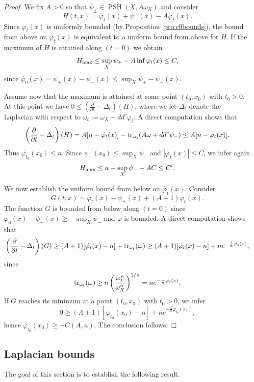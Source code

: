 \documentclass[a4paper,11pt,leqno,english]{smfart}
\theoremstyle{plain}
\theoremstyle{plain}
\numberwithin{equation}{section} %
\numberwithin{figure}{section} %
\theoremstyle{plain}
\theoremstyle{plain}
\theoremstyle{remark}
\theoremstyle{remark}
\theoremstyle{definition}
\theoremstyle{plain}
\theoremstyle{plain}
\theoremstyle{definition}
\newcommand{\f}{\varphi}
\newcommand{\p}{\psi}
\newcommand{\PSH}{\operatorname{PSH}}
\begin{document}
\begin{proof}
We fix $A>0$  so that $\p_{\pm} \in \PSH(X,A \omega_X)$ and
consider 
$$
H(t,x)=\dot{\f_t}(x)+\p_-(x)-A \f_t(x).
$$
Since $\f_t(x)$ is uniformly bounded (by Proposition \ref{pro:c0bounds}), the bound from above on
$\dot{\f_t}(x)$ is equivalent to a uniform bound from above for $H$.
If the maximum of $H$ is attained along $(t=0)$ we obtain
$$
H_{\rm max} \leq \sup_X \p_+-A \inf \f_t(x) \leq C,
$$
since $\dot{\f_0}(x)=\p_+(x)-\p_-(x)\leq \sup_X \p_+-\p_-(x)$.

Assume now that the maximum is attained at some point
$({t_0},x_0)$ with ${t_0}>0$. At this point we have
$0 \leq \left(\frac{\partial}{\partial t}-\Delta_t \right)(H)$,
where we let $\Delta_t$ denote the Laplacian with respect to $\omega_t:=\omega_X+dd^c \f_t$.
A direct computation shows that
$$
\left(\frac{\partial}{\partial t}-\Delta_t \right)(H)
=A[n-\dot{\f_t}(x)]-{\rm tr}_{\omega_t}(A \omega+dd^c \p_-)
\leq A[n-\dot{\f_t}(x)].
$$
Thus $\dot{\f_{{t_0}}}(x_0) \leq n$. Since $\p_-(x_0) \leq \sup_X \p_-$ and 
$|\f_{t}(x) | \leq C$, we infer again
$$
H_{\rm max} \leq n +\sup_X \p_- +A C\leq C'.\\
$$



We now establish the uniform bound from below on $\dot{\f_t}(x)$.
Consider 
$$
G(t,x)=\dot{\f_t}(x)-\p_+(x)+(A+1) \f_t(x).
$$
The function $G$ is bounded from below along $(t=0)$ since
$\dot{\f_0}(x) -\p_+(x) \geq -\sup_X \p_-$
and $\f$ is bounded.  A direct computation shows that
$$
\left(\frac{\partial}{\partial t}-\Delta_t \right)(G)
\geq (A+1) [\dot{\f_t}(x)-n]+{\rm tr}_{\omega_t}(\omega)
\geq (A+1) [\dot{\f_t}(x)-n]+n e^{-\frac{1}{n} \dot{\f_t}(x)},
$$
since
$$
{\rm tr}_{\omega_t}(\omega) \geq n \left( \frac{\omega_t^n}{\omega_X^n} \right)^{1/n} =n e^{-\frac{1}{n} \dot{\f_t}(x)}.
$$
If $G$ reaches its minimum at a point $({t_0},x_0)$ with ${t_0}>0$, we infer
$$
0 \geq (A+1) [\dot{\f_{{t_0}}}(x_0)-n]+n e^{-\frac{1}{n} \dot{\f_{{t_0}}}(x_0)},
$$
hence $\dot{\f_{{t_0}}}(x_0) \geq -C(A,n)$. The conclusion follows.
\end{proof}

 
 
 
 
 
 
 
 \subsection{Laplacian bounds}
 
The goal of this section is to establish the following result.
\end{document}

